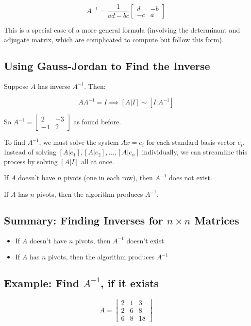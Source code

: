 \documentclass[12pt,a4paper]{article}
\begin{document}
\[
A^{-1} = \frac{1}{ad-bc} \begin{bmatrix} d & -b \\ -c & a \end{bmatrix}
\]

This is a special case of a more general formula (involving the determinant and adjugate matrix, which are complicated to compute but follow this form).

\subsection{Using Gauss-Jordan to Find the Inverse}

Suppose $A$ has inverse $A^{-1}$. Then:

\[
AA^{-1} = I \implies [A|I] \sim [I|A^{-1}]
\]

So $A^{-1} = \begin{bmatrix} 2 & -3 \\ -1 & 2 \end{bmatrix}$ as found before.

To find $A^{-1}$, we must solve the system $Ax = e_i$ for each standard basis vector $e_i$. Instead of solving $[A|e_1], [A|e_2], \ldots, [A|e_n]$ individually, we can streamline this process by solving $[A|I]$ all at once.

If $A$ doesn't have $n$ pivots (one in each row), then $A^{-1}$ does not exist.

If $A$ has $n$ pivots, then the algorithm produces $A^{-1}$.

\subsection{Summary: Finding Inverses for $n \times n$ Matrices}

\begin{itemize}
    \item If $A$ doesn't have $n$ pivots, then $A^{-1}$ doesn't exist
    \item If $A$ has $n$ pivots, then the algorithm produces $A^{-1}$
\end{itemize}

\subsection{Example: Find $A^{-1}$, if it exists}

\[
A = \begin{bmatrix}
2 & 1 & 3 \\
2 & 6 & 8 \\
6 & 8 & 18
\end{bmatrix}
\]
\end{document}
